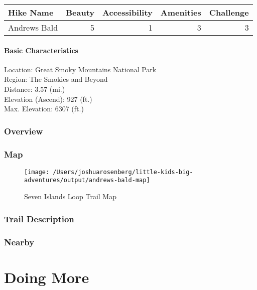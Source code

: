 \documentclass[
]{book}
\begin{document}
\begin{tabular}{l|r|r|r|r}
\hline
Hike Name & Beauty & Accessibility & Amenities & Challenge\\
\hline
Andrews Bald & 5 & 1 & 3 & 3\\
\hline
\end{tabular}

\hypertarget{basic-characteristics-17}{%
\subsection{Basic Characteristics}\label{basic-characteristics-17}}

Location: Great Smoky Mountains National Park\\
Region: The Smokies and Beyond\\
Distance: 3.57 (mi.)\\
Elevation (Ascend): 927 (ft.)\\
Max. Elevation: 6307 (ft.)

\hypertarget{overview-17}{%
\section{Overview}\label{overview-17}}

\hypertarget{map-17}{%
\section{Map}\label{map-17}}

\begin{figure}
\texttt{[image: /Users/joshuarosenberg/little-kids-big-adventures/output/andrews-bald-map]} \caption{Seven Islands Loop Trail Map}\label{fig:unnamed-chunk-57}
\end{figure}

\hypertarget{trail-description-18}{%
\section{Trail Description}\label{trail-description-18}}

\hypertarget{nearby-18}{%
\section{Nearby}\label{nearby-18}}

\hypertarget{part-doing-more}{%
\part{Doing More}\label{part-doing-more}}
\end{document}
